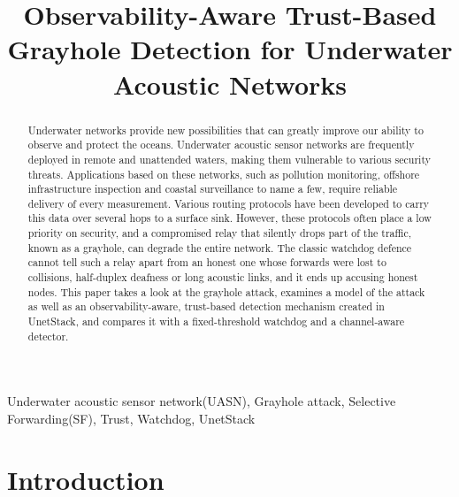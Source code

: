\documentclass[conference]{IEEEtran}
\begin{document}
\title{Observability-Aware Trust-Based Grayhole Detection for Underwater Acoustic Networks}

\author{
}

\maketitle

\begin{abstract}
Underwater networks provide new possibilities that can greatly improve our ability to observe and protect the oceans. Underwater acoustic sensor networks are frequently deployed in remote and unattended waters, making them vulnerable to various security threats. Applications based on these networks, such as pollution monitoring, offshore infrastructure inspection and coastal surveillance to name a few, require reliable delivery of every measurement. Various routing protocols have been developed to carry this data over several hops to a surface sink. However, these protocols often place a low priority on security, and a compromised relay that silently drops part of the traffic, known as a grayhole, can degrade the entire network. The classic watchdog defence cannot tell such a relay apart from an honest one whose forwards were lost to collisions, half-duplex deafness or long acoustic links, and it ends up accusing honest nodes. This paper takes a look at the grayhole attack, examines a model of the attack as well as an observability-aware, trust-based detection mechanism created in UnetStack, and compares it with a fixed-threshold watchdog and a channel-aware detector.
\end{abstract}

\begin{IEEEkeywords}
Underwater acoustic sensor network(UASN), Grayhole attack, Selective Forwarding(SF), Trust, Watchdog, UnetStack
\end{IEEEkeywords}

\section{Introduction}
\end{document}
